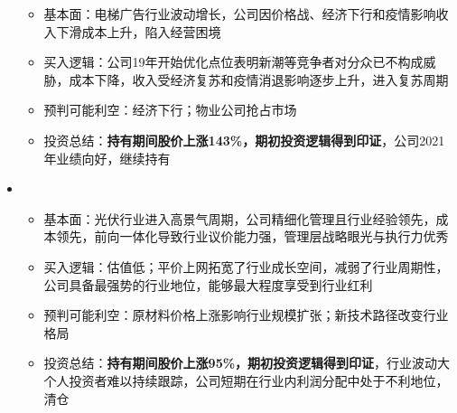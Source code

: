 \begin{itemize}[leftmargin=*]
{      \begin{itemize}
        \item 基本面：电梯广告行业波动增长，公司因价格战、经济下行和疫情影响收入下滑成本上升，陷入经营困境
        \item 买入逻辑：公司19年开始优化点位表明新潮等竞争者对分众已不构成威胁，成本下降，收入受经济复苏和疫情消退影响逐步上升，进入复苏周期
        \item 预判可能利空：经济下行；物业公司抢占市场
        \item 投资总结：\textbf{持有期间股价上涨143\%，期初投资逻辑得到印证}，公司2021年业绩向好，继续持有
      \end{itemize}
      }
      \item
      {\small
      \begin{itemize}
        \item 基本面：光伏行业进入高景气周期，公司精细化管理且行业经验领先，成本领先，前向一体化导致行业议价能力强，管理层战略眼光与执行力优秀
        \item 买入逻辑：估值低；平价上网拓宽了行业成长空间，减弱了行业周期性，公司具备最强势的行业地位，能够最大程度享受到行业红利
        \item 预判可能利空：原材料价格上涨影响行业规模扩张；新技术路径改变行业格局
        \item 投资总结：\textbf{持有期间股价上涨95\%，期初投资逻辑得到印证}，行业波动大个人投资者难以持续跟踪，公司短期在行业内利润分配中处于不利地位，清仓
      \end{itemize}
      }
  \end{itemize}